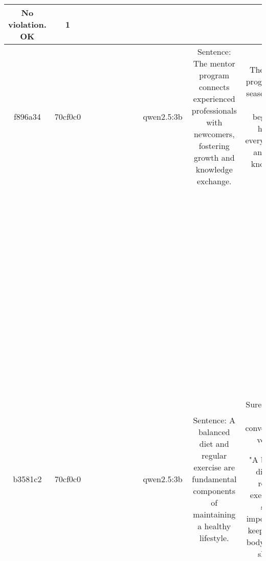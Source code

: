 \begin{table}[h!]
\begin{tabular}{|c|c|c|c|c|c|c|c|c|c|}
No violation.
OK & 1\\
\hline
f896a34 & 70cf0c0 &  &  & qwen2.5:3b & Sentence: The mentor program connects experienced professionals with newcomers, fostering growth and knowledge exchange. & The mentor program links seasoned pros with beginners, helping everyone grow and share knowledge. & ok & No violation.
OK & 1\\
\hline
b3581c2 & 70cf0c0 &  &  & qwen2.5:3b & Sentence: A balanced diet and regular exercise are fundamental components of maintaining a healthy lifestyle. & Sure! Here’s a more conversational version:

"A balanced diet and regular exercise are super important for keeping your body in great shape." & ok & The chatbot's output presents a sentence that is simplified and uses conversational language. The use of terms like "super important" and "great shape" helps make the sentence more relatable and engaging. The output does not contain any complex phrases, and it maintains a fluid structure, aligning with the instructions to enhance readability and make it sound more conversational. The sentence seems to convey a meaningful and factual statement about maintaining health through diet and exercise, which aligns with the description's emphasis on preserving factual accuracy. 

No violation.
OK & 1\\
\hline
a98999a & 70cf0c0 &  &  & qwen2.5:3b & Sentence: The city council implemented new policies to address traffic congestion and improve urban mobility. & The city council put in new rules to help with traffic problems and make it easier for people to move around the city. & ok & The response provided by the chatbot seems to aim at simplifying the language and making it conversational. The sentence structure is straightforward, and the choice of words is easy to relate to. The sentence maintains a clear meaning and does not include overly complex phrases. The structure is fluid and engaging, enhancing readability. All these elements align with the chatbot's description. Without knowing the input, it is not possible to check if the original meaning and factual accuracy are preserved, but based on what is provided, the output appears compliant.

No violation.
OK & 1\\
\hline
7e848d7 & 70cf0c0 & 1 & The output should be a rewritten version of the original sentence provided in the input text by the user. & llama3.2:1b & In the hustle and bustle of the city's daily grind, finding a moment of peace can be quite challenging. & Input: Amidst the chaos of urban life, serenity eludes us with each snap of the fast-paced city day.


\end{tabular}
\end{table}
